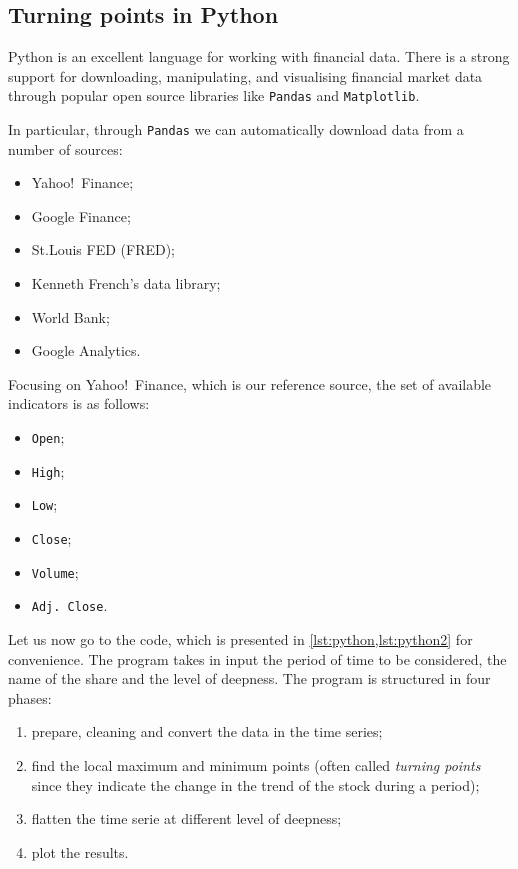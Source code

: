 \documentclass[a4paper]{article}
\begin{document}
\subsection{Turning points in Python}\label{sec:tp_python}

Python is an excellent language for working with financial data. There is a strong support for downloading, manipulating, and visualising financial market data through popular open source libraries like \texttt{Pandas} and \texttt{Matplotlib}.

In particular, through \texttt{Pandas} we can automatically download data from a number of sources: \begin{itemize}
	\item Yahoo!\ Finance;
	\item Google Finance;
	\item St.Louis FED (FRED);
	\item Kenneth French's data library;
	\item World Bank;
	\item Google Analytics.
\end{itemize}

Focusing on Yahoo!\ Finance, which is our reference source, the set of available indicators is as follows: \begin{itemize}
	\item \texttt{Open};
	\item \texttt{High};
	\item \texttt{Low};
	\item \texttt{Close};
	\item \texttt{Volume};
	\item \texttt{Adj.\ Close}.
\end{itemize}

Let us now go to the code, which is presented in \cref{lst:python,lst:python2} for convenience. The program takes in input the period of time to be considered, the name of the share and the level of deepness. The program is structured in four phases: \begin{enumerate}
	\item prepare, cleaning and convert the data in the time series;
	\item find the local maximum and minimum points (often called \emph{turning points} since they indicate the change in the trend of the stock during a period);
	\item flatten the time serie at different level of deepness;
	\item plot the results.
\end{enumerate}
\end{document}
